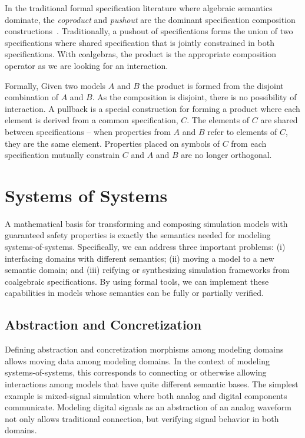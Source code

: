\documentclass[12pt]{article}
\begin{document}
In the traditional formal specification literature where algebraic
semantics dominate, the \emph{coproduct} and \emph{pushout} are the
dominant specification composition
constructions~\cite{Ehrig:85:Fundamentals-of,Smith:93:Constructing-Sp,Smith:90:KIDS:-A-Semiaut}.
Traditionally, a pushout of specifications forms the union of two
specifications where shared specification that is jointly constrained
in both specifications.  With coalgebras, the product is the
appropriate composition operator as we are looking for an interaction.

Formally, Given two models $A$ and $B$ the product is formed from the
disjoint combination of $A$ and $B$. As the composition is disjoint,
there is no possibility of interaction.  A pullback is a special
construction for forming a product where each element is derived from
a common specification, $C$.  The elements of $C$ are shared between
specifications -- when properties from $A$ and $B$ refer to
elements of $C$, they are the same element.  Properties placed on
symbols of $C$ from each specification mutually constrain $C$ and $A$
and $B$ are no longer orthogonal.

\section{Systems of Systems}

A mathematical basis for transforming and composing simulation models
with guaranteed safety properties is exactly the semantics needed for
modeling systems-of-systems.  Specifically, we can address three
important problems: (i) interfacing domains with different semantics;
(ii) moving a model to a new semantic domain; and (iii) reifying or
synthesizing simulation frameworks from coalgebraic specifications.
By using formal tools, we can implement these capabilities in models
whose semantics can be fully or partially verified.

\subsection{Abstraction and Concretization}

Defining abstraction and concretization morphisms among modeling
domains allows moving data among modeling domains.  In the context of
modeling systems-of-systems, this corresponds to connecting or
otherwise allowing interactions among models that have quite different
semantic bases.  The simplest example is mixed-signal simulation where
both analog and digital components communicate.  Modeling digital
signals as an abstraction of an analog waveform not only allows
traditional connection, but verifying signal behavior in both domains.
\end{document}
